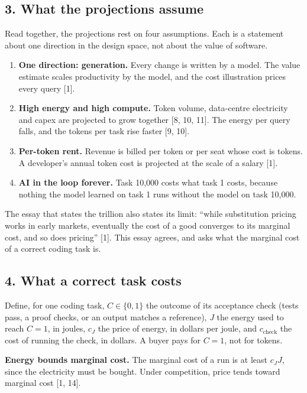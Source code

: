 \documentclass[
  10pt,
]{article}
\providecommand{\tightlist}{%
  \setlength{\itemsep}{0pt}\setlength{\parskip}{0pt}}
\begin{document}
\subsection{3. What the projections
assume}\label{what-the-projections-assume}

Read together, the projections rest on four assumptions. Each is a
statement about one direction in the design space, not about the value
of software.

\begin{enumerate}
\def\labelenumi{\arabic{enumi}.}
\tightlist
\item
  \textbf{One direction: generation.} Every change is written by a
  model. The value estimate scales productivity by the model, and the
  cost illustration prices every query {[}1{]}.
\item
  \textbf{High energy and high compute.} Token volume, data-centre
  electricity and capex are projected to grow together {[}8, 10, 11{]}.
  The energy per query falls, and the tokens per task rise faster {[}9,
  10{]}.
\item
  \textbf{Per-token rent.} Revenue is billed per token or per seat whose
  cost is tokens. A developer's annual token cost is projected at the
  scale of a salary {[}1{]}.
\item
  \textbf{AI in the loop forever.} Task 10,000 costs what task 1 costs,
  because nothing the model learned on task 1 runs without the model on
  task 10,000.
\end{enumerate}

The essay that states the trillion also states its limit: ``while
substitution pricing works in early markets, eventually the cost of a
good converges to its marginal cost, and so does pricing'' {[}1{]}. This
essay agrees, and asks what the marginal cost of a correct coding task
is.

\subsection{4. What a correct task
costs}\label{what-a-correct-task-costs}

Define, for one coding task, \(C \in \{0, 1\}\) the outcome of its
acceptance check (tests pass, a proof checks, or an output matches a
reference), \(J\) the energy used to reach \(C = 1\), in joules, \(c_J\)
the price of energy, in dollars per joule, and \(c_{\text{check}}\) the
cost of running the check, in dollars. A buyer pays for \(C = 1\), not
for tokens.

\textbf{Energy bounds marginal cost.} The marginal cost of a run is at
least \(c_J J\), since the electricity must be bought. Under
competition, price tends toward marginal cost {[}1, 14{]}.
\end{document}
